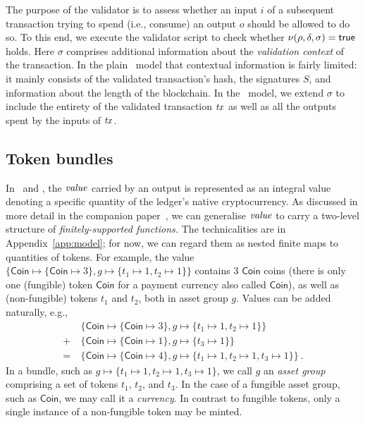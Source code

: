 The purpose of the validator is to assess whether an input $i$ of a subsequent transaction trying to spend (i.e., consume) an output $o$ should be allowed to do so.
To this end, we execute the validator script to check whether \(\nu(\rho, \delta, \sigma) = \mathsf{true}\) holds.
Here $\sigma$ comprises additional information about the \emph{validation context} of the transaction.
In the plain \UTXO\ model that contextual information is fairly limited: it mainly consists of the validated transaction's hash, the signatures $S$, and information about the length of the blockchain. In the \EUTXO\ model, we extend $\sigma$ to include the entirety of the validated transaction $\mathit{tx}$ as well as all the outputs spent by the inputs of $\mathit{tx}$.

\subsection{Token bundles}
\label{sec:informal-token-bundles}

In \UTXO\ and \EUTXO, the $\mathit{value}$ carried by an output is represented as an integral value denoting a specific quantity of the ledger's native cryptocurrency.
As discussed in more detail in the companion paper~\cite{plain-multicurrency}, we can generalise $\mathit{value}$ to carry a two-level structure of \emph{finitely-supported functions.}
The technicalities are in Appendix~\ref{app:model}; for now, we can regard them as nested finite maps to quantities of tokens.
For example, the value
\(\{\mathsf{Coin} \mapsto \{\mathsf{Coin} \mapsto 3\}, g \mapsto \{t_1
\mapsto 1, t_2 \mapsto 1\}\}\) contains $3$ $\mathsf{Coin}$ coins
(there is only one (fungible) token $\mathsf{Coin}$ for a payment
currency also called $\mathsf{Coin}$), as well as (non-fungible) tokens $t_1$ and $t_2$,
both in asset group $g$.  Values can be added naturally, e.g.,
\begin{align*}
 & \{\mathsf{Coin} \mapsto \{\mathsf{Coin} \mapsto 3\}, g \mapsto \{t_1
   \mapsto 1, t_2 \mapsto 1\}\} \\
 + \ & \{\mathsf{Coin} \mapsto \{\mathsf{Coin} \mapsto 1\}, g \mapsto \{t_3 \mapsto 1\}\} \\
 = \ & \{\mathsf{Coin} \mapsto \{\mathsf{Coin} \mapsto 4\}, g \mapsto \{t_1
       \mapsto 1, t_2 \mapsto 1, t_3 \mapsto 1\}\} \ .
\end{align*}
%
In a bundle, such as \(g \mapsto \{t_1 \mapsto 1, t_2 \mapsto 1, t_3 \mapsto 1\}\), we call $g$ an \emph{asset group} comprising a set of tokens $t_1$, $t_2$, and $t_3$. In the case of a fungible asset group, such as $\mathsf{Coin}$, we may call it a \emph{currency}.
In contrast to fungible tokens, only a single instance of a non-fungible token may be minted.

